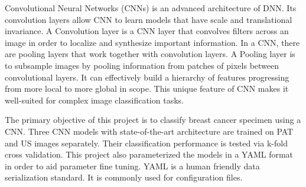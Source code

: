 Convolutional Neural Networks (CNNs) \citep{Krizhevsky2017} is an advanced architecture of DNN. Its convolution layers allow CNN to learn models that have scale and translational invariance. A Convolution layer is a CNN layer that convolves filters across an image in order to localize and synthesize important information. In a CNN, there are pooling layers that work together with convolution layers. A Pooling layer is to subsample images by pooling information from patches of pixels between convolutional layers. It can effectively build a hierarchy of features progressing from more local to more global in scope. This unique feature of CNN makes it well-suited for complex image classification tasks.

The primary objective of this project is to classify breast cancer specimen using a CNN. Three CNN models with state-of-the-art architecture are trained on PAT and US images separately. Their classification performance is tested via k-fold cross validation. This project also parameterized the models in a YAML format in order to aid parameter fine tuning. YAML is a human friendly data serialization standard. It is commonly used for configuration files.





